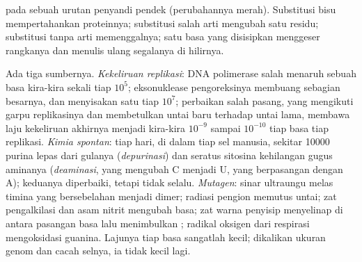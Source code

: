 \begin{omfigure}

{\small {} pada sebuah urutan penyandi pendek (perubahannya
merah). Substitusi bisu mempertahankan proteinnya; substitusi salah
arti mengubah satu residu; substitusi tanpa arti memenggalnya; satu
basa yang disisipkan menggeser rangkanya dan menulis ulang segalanya di
hilirnya.}
\end{omfigure}

\begin{proposition}\label{prop:b2:genome-diversification:sources}
Ada tiga sumbernya. \emph{Kekeliruan replikasi}: DNA polimerase salah
menaruh sebuah basa kira-kira sekali tiap $10^{5}$; eksonuklease
pengoreksinya membuang sebagian besarnya, dan menyisakan satu tiap
$10^{7}$; perbaikan salah pasang, yang mengikuti garpu replikasinya dan
membetulkan untai baru terhadap untai lama, membawa laju kekeliruan
akhirnya menjadi kira-kira $10^{-9}$ sampai $10^{-10}$ tiap basa tiap
replikasi. \emph{Kimia spontan}: tiap hari, di dalam tiap sel manusia,
sekitar \num{10000} purina lepas dari gulanya
(\emph{depurinasi}) dan seratus sitosina kehilangan gugus aminanya
(\emph{deaminasi}, yang mengubah C menjadi U, yang berpasangan dengan
A); keduanya diperbaiki, tetapi tidak selalu. \emph{Mutagen}: sinar
ultraungu melas timina yang bersebelahan menjadi dimer; radiasi
pengion memutus untai; zat pengalkilasi dan asam nitrit mengubah basa;
zat warna penyisip menyelinap di antara pasangan basa lalu menimbulkan
; radikal oksigen dari
respirasi mengoksidasi guanina. Lajunya tiap basa sangatlah kecil;
dikalikan ukuran genom dan cacah selnya, ia tidak kecil lagi.
\end{proposition}

